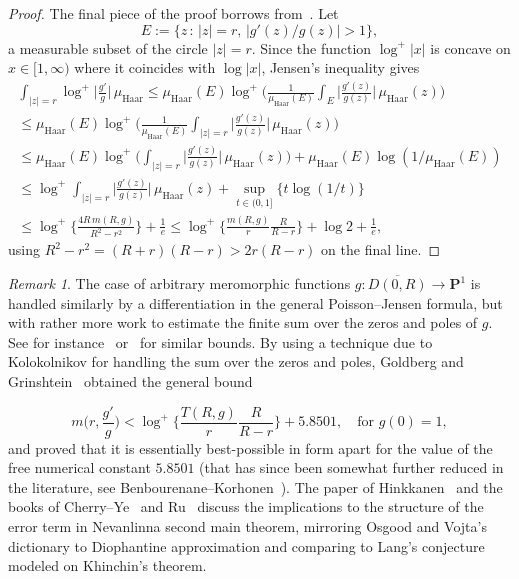 \documentclass[10pt]{amsart}
\def\SSS{\S}
\theoremstyle{remark}
\newtheorem{remark}[subsubsection]{Remark}
\numberwithin{equation}{subsection}
\def\numequation{\addtocounter{subsubsection}{1}\begin{equation}}
\begin{document}
\begin{proof}
The final piece of the proof borrows from~\cite[section~4]{BenbourenaneKorhonen}.
Let
$$
E := \Big\{ z \, : \, |z| = r, \, |g'(z)/g(z)| > 1 \Big\},
$$
a measurable subset of the circle $|z| = r$.
Since the function $\log^+{|x|}$ is concave on $x \in [1,\infty)$ where it coincides with $\log{|x|}$, Jensen's inequality gives
\begin{equation*}
\begin{split}
\int_{|z| = r} \log^+{\Big| \frac{g'}{g} \Big|} \, \mu_{\mathrm{Haar}}  \leq \mu_{\mathrm{Haar}}(E) \log^+ \Big(
\frac{1}{\mu_{\mathrm{Haar}}(E)} \int_{E} \Big| \frac{g'(z)}{g(z)} \Big| \, \mu_{\mathrm{Haar}}(z) \Big) \\
\leq  \mu_{\mathrm{Haar}}(E) \log^+ \Big(
\frac{1}{\mu_{\mathrm{Haar}}(E)} \int_{|z|=r} \Big| \frac{g'(z)}{g(z)} \Big| \, \mu_{\mathrm{Haar}}(z) \Big) \\
\leq  \mu_{\mathrm{Haar}}(E) \log^+ \Big(
 \int_{|z|=r} \Big| \frac{g'(z)}{g(z)} \Big| \, \mu_{\mathrm{Haar}}(z) \Big) +  \mu_{\mathrm{Haar}}(E)\log(1/\mu_{\mathrm{Haar}}(E))\\
\leq \log^+ \int_{|z| = r}  \Big| \frac{g'(z)}{g(z)} \Big| \, \mu_{\mathrm{Haar}}(z)   
+ \sup_{t \in (0,1]} \big\{ t\log{(1/t)} \big\} \\
\leq  \log^+{ \Big\{ \frac{4R \, m(R,g)}{R^2  -r^2} \Big\} } + \frac{1}{e} 
\leq     \log^+{\Big\{ \frac{m(R,g)}{r} \frac{R}{R-r} \Big\}} +  \log{2} + \frac{1}{e}, 
\end{split}
\end{equation*}
using $R^2 - r^2 = (R+r)(R-r) > 2r(R-r)$ on the final line.
\end{proof}


\begin{remark}\label{log-deri-history}
The case of arbitrary meromorphic functions $g : \overline{D(0,R)} \to \mathbf{P}^1$ is handled 
similarly by a differentiation in the  general Poisson--Jensen formula, but with rather more work to estimate
the finite sum over the zeros and poles of $g$. See for instance~\cite[\SSS~IX.3.1, page~244, (3.2)]{Nevanlinna} or~\cite[Lemma~2.3 on page~36]{Hayman} for similar bounds.
By using a technique due to Kolokolnikov for
handling the sum over the zeros and poles, Goldberg and Grinshtein~\cite{GoldbergGrinshtein} 
obtained the general bound
\numequation \label{log derivative lemma}
m\Big(r , \frac{g'}{g}\Big) <  \log^+{\Big\{ \frac{T(R,g)}{r} \frac{R}{R-r} \Big\}}
+ 5.8501,  \quad \textrm{for } g(0) = 1, 
\end{equation}
and proved that it is essentially best-possible in form apart for the value of the free numerical constant $5.8501$ (that has since been somewhat
further reduced in the literature, see Benbourenane--Korhonen~\cite{BenbourenaneKorhonen}).  The paper of  Hinkkanen~\cite{Hinkkanen} and the books of Cherry--Ye~\cite{CherryYe} and Ru~\cite{MinRu}
 discuss the implications to the structure of the error term in Nevanlinna second main theorem,
mirroring Osgood and Vojta's dictionary to Diophantine approximation and comparing to Lang's conjecture modeled on Khinchin's theorem.
\end{remark}
\end{document}
